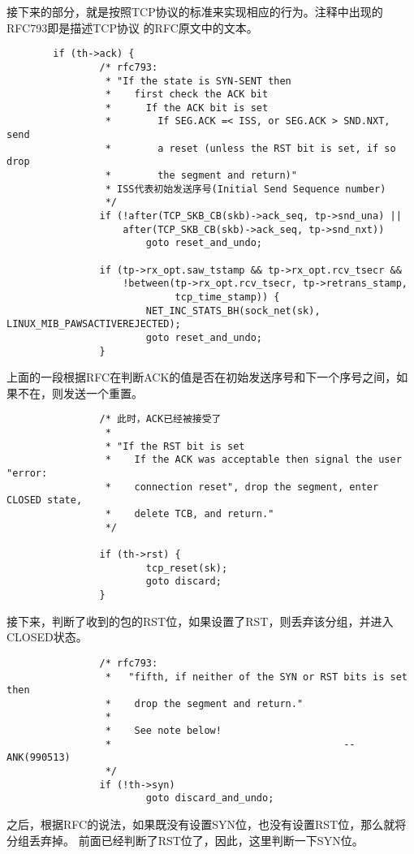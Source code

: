 接下来的部分，就是按照TCP协议的标准来实现相应的行为。注释中出现的RFC793即是描述TCP协议
的RFC原文中的文本。
\begin{verbatim}
        if (th->ack) {
                /* rfc793:
                 * "If the state is SYN-SENT then
                 *    first check the ACK bit
                 *      If the ACK bit is set
                 *        If SEG.ACK =< ISS, or SEG.ACK > SND.NXT, send
                 *        a reset (unless the RST bit is set, if so drop
                 *        the segment and return)"
                 * ISS代表初始发送序号(Initial Send Sequence number)
                 */
                if (!after(TCP_SKB_CB(skb)->ack_seq, tp->snd_una) ||
                    after(TCP_SKB_CB(skb)->ack_seq, tp->snd_nxt))
                        goto reset_and_undo;

                if (tp->rx_opt.saw_tstamp && tp->rx_opt.rcv_tsecr &&
                    !between(tp->rx_opt.rcv_tsecr, tp->retrans_stamp,
                             tcp_time_stamp)) {
                        NET_INC_STATS_BH(sock_net(sk), LINUX_MIB_PAWSACTIVEREJECTED);
                        goto reset_and_undo;
                }
\end{verbatim}
上面的一段根据RFC在判断ACK的值是否在初始发送序号和下一个序号之间，如果不在，则发送一个重置。
\begin{verbatim}
                /* 此时，ACK已经被接受了
                 *
                 * "If the RST bit is set
                 *    If the ACK was acceptable then signal the user "error:
                 *    connection reset", drop the segment, enter CLOSED state,
                 *    delete TCB, and return."
                 */

                if (th->rst) {
                        tcp_reset(sk);
                        goto discard;
                }
\end{verbatim}
接下来，判断了收到的包的RST位，如果设置了RST，则丢弃该分组，并进入CLOSED状态。
\begin{verbatim}
                /* rfc793:
                 *   "fifth, if neither of the SYN or RST bits is set then
                 *    drop the segment and return."
                 *
                 *    See note below!
                 *                                        --ANK(990513)
                 */
                if (!th->syn)
                        goto discard_and_undo;
\end{verbatim}
之后，根据RFC的说法，如果既没有设置SYN位，也没有设置RST位，那么就将分组丢弃掉。
前面已经判断了RST位了，因此，这里判断一下SYN位。

